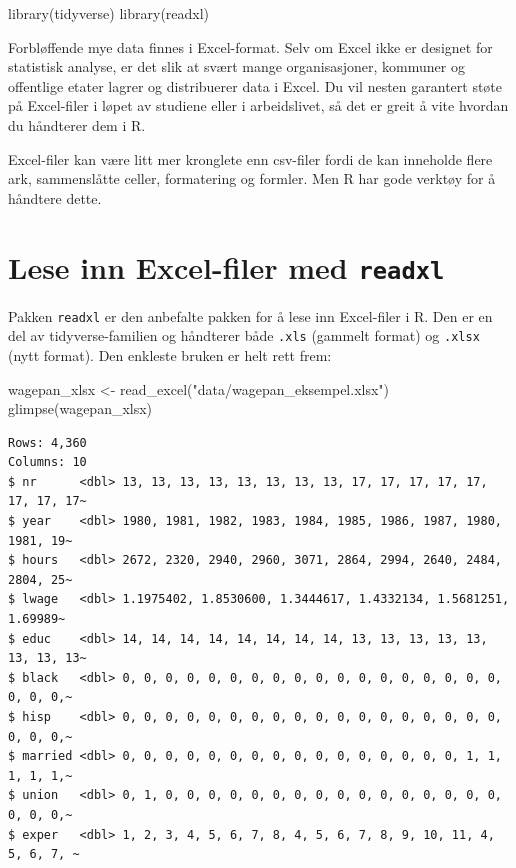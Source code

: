 \documentclass[
  norsk,
  letterpaper,
  DIV=11,
  numbers=noendperiod]{scrreprt}
\newenvironment{Shaded}{\begin{snugshade}}{\end{snugshade}}
\newcommand{\FunctionTok}[1]{\textcolor[rgb]{0.28,0.35,0.67}{#1}}
\newcommand{\NormalTok}[1]{\textcolor[rgb]{0.00,0.23,0.31}{#1}}
\newcommand{\OtherTok}[1]{\textcolor[rgb]{0.00,0.23,0.31}{#1}}
\newcommand{\StringTok}[1]{\textcolor[rgb]{0.13,0.47,0.30}{#1}}
\theoremstyle{definition}
\theoremstyle{remark}
\begin{document}
\begin{Shaded}
\begin{Highlighting}[]
\FunctionTok{library}\NormalTok{(tidyverse)}
\FunctionTok{library}\NormalTok{(readxl)}
\end{Highlighting}
\end{Shaded}

Forbløffende mye data finnes i Excel-format. Selv om Excel ikke er
designet for statistisk analyse, er det slik at svært mange
organisasjoner, kommuner og offentlige etater lagrer og distribuerer
data i Excel. Du vil nesten garantert støte på Excel-filer i løpet av
studiene eller i arbeidslivet, så det er greit å vite hvordan du
håndterer dem i R.

Excel-filer kan være litt mer kronglete enn csv-filer fordi de kan
inneholde flere ark, sammenslåtte celler, formatering og formler. Men R
har gode verktøy for å håndtere dette.

\section{\texorpdfstring{Lese inn Excel-filer med
\texttt{readxl}}{Lese inn Excel-filer med readxl}}\label{lese-inn-excel-filer-med-readxl}

Pakken \texttt{readxl} er den anbefalte pakken for å lese inn
Excel-filer i R. Den er en del av tidyverse-familien og håndterer både
\texttt{.xls} (gammelt format) og \texttt{.xlsx} (nytt format). Den
enkleste bruken er helt rett frem:

\begin{Shaded}
\begin{Highlighting}[]
\NormalTok{wagepan\_xlsx }\OtherTok{\textless{}{-}} \FunctionTok{read\_excel}\NormalTok{(}\StringTok{"data/wagepan\_eksempel.xlsx"}\NormalTok{)}
\FunctionTok{glimpse}\NormalTok{(wagepan\_xlsx)}
\end{Highlighting}
\end{Shaded}

\begin{verbatim}
Rows: 4,360
Columns: 10
$ nr      <dbl> 13, 13, 13, 13, 13, 13, 13, 13, 17, 17, 17, 17, 17, 17, 17, 17~
$ year    <dbl> 1980, 1981, 1982, 1983, 1984, 1985, 1986, 1987, 1980, 1981, 19~
$ hours   <dbl> 2672, 2320, 2940, 2960, 3071, 2864, 2994, 2640, 2484, 2804, 25~
$ lwage   <dbl> 1.1975402, 1.8530600, 1.3444617, 1.4332134, 1.5681251, 1.69989~
$ educ    <dbl> 14, 14, 14, 14, 14, 14, 14, 14, 13, 13, 13, 13, 13, 13, 13, 13~
$ black   <dbl> 0, 0, 0, 0, 0, 0, 0, 0, 0, 0, 0, 0, 0, 0, 0, 0, 0, 0, 0, 0, 0,~
$ hisp    <dbl> 0, 0, 0, 0, 0, 0, 0, 0, 0, 0, 0, 0, 0, 0, 0, 0, 0, 0, 0, 0, 0,~
$ married <dbl> 0, 0, 0, 0, 0, 0, 0, 0, 0, 0, 0, 0, 0, 0, 0, 0, 1, 1, 1, 1, 1,~
$ union   <dbl> 0, 1, 0, 0, 0, 0, 0, 0, 0, 0, 0, 0, 0, 0, 0, 0, 0, 0, 0, 0, 0,~
$ exper   <dbl> 1, 2, 3, 4, 5, 6, 7, 8, 4, 5, 6, 7, 8, 9, 10, 11, 4, 5, 6, 7, ~
\end{verbatim}
\end{document}

